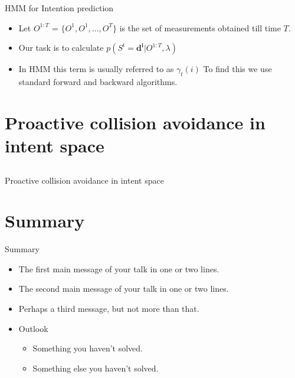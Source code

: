 \documentclass{beamer}
\begin{document}
\begin{frame}{HMM for Intention prediction}
\begin{itemize}
\item{Let $O^{1:T}$ = $\{O^1,O^1,...,O^T\}$ is the set of measurements obtained till time $T$.}
\item{Our task is to calculate $p(S^t = \mathbf{d^i} | O^{1:T} 
,\lambda)$}

\item{ In HMM this term is usually referred to as $\gamma_t(i)$ To find this we use standard forward and backward algorithms.}
\end{itemize}

\end{frame}


\section{Proactive collision avoidance in intent space}
\subsection{}
\begin{frame}{Proactive collision avoidance in intent space}
\end{frame}
\section*{Summary}

\begin{frame}{Summary}
  \begin{itemize}
  \item
    The \alert{first main message} of your talk in one or two lines.
  \item
    The \alert{second main message} of your talk in one or two lines.
  \item
    Perhaps a \alert{third message}, but not more than that.
  \end{itemize}
  
  \begin{itemize}
  \item
    Outlook
    \begin{itemize}
    \item
      Something you haven't solved.
    \item
      Something else you haven't solved.
    \end{itemize}
  \end{itemize}
\end{frame}
\end{document}
